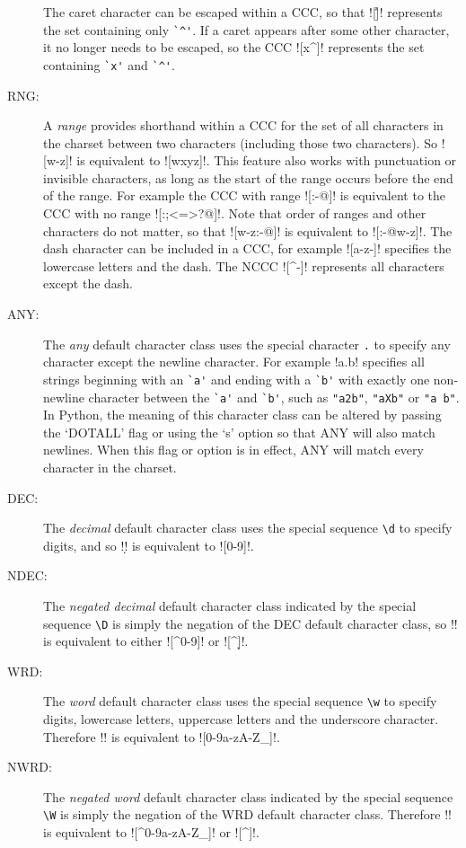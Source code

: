 \begin{description}
The caret character can be escaped within a CCC, so that \cverb![\^]! represents the set containing only \verb!`^'!.  If a caret appears after some other character, it no longer needs to be escaped, so the CCC \cverb![x^]! represents the set containing \verb!`x'! and \verb!`^'!.
\item[RNG:] A \emph{range} provides shorthand within a CCC for the set of all characters in the charset between two characters (including those two characters).  So \cverb![w-z]! is equivalent to \cverb![wxyz]!.  This feature also works with punctuation or invisible characters, as long as the start of the range occurs before the end of the range.  For example the CCC with range \cverb![:-@]! is equivalent to the CCC with no range \cverb![:;<=>?@]!.  Note that order of ranges and other characters do not matter, so that \cverb![w-z:-@]! is equivalent to \cverb![:-@w-z]!.  The dash character can be included in a CCC, for example \cverb![a-z-]! specifies the lowercase letters and the dash.  The NCCC \cverb![^-]! represents all characters except the dash.
\item[ANY:] The \emph{any} default character class uses the special character \verb!.! to specify any character except the newline character.  For example \cverb!a.b! specifies all strings beginning with an \verb!`a'! and ending with a \verb!`b'! with exactly one non-newline character between the \verb!`a'! and \verb!`b'!, such as \verb!"a2b"!, \verb!"aXb"! or \verb!"a b"!.  In Python, the meaning of this character class can be altered by passing the `DOTALL' flag or using the `s' option so that ANY will also match newlines.  When this flag or option is in effect, ANY will match every character in the charset.
\item[DEC:] The \emph{decimal} default character class uses the special sequence \verb!\d! to specify digits, and so \cverb!\d! is equivalent to \cverb![0-9]!.
\item[NDEC:] The \emph{negated decimal} default character class indicated by the special sequence \verb!\D! is simply the negation of the DEC default character class, so \cverb!\D! is equivalent to either \cverb![^0-9]! or \cverb![^\d]!.
\item[WRD:] The \emph{word} default character class uses the special sequence \verb!\w! to specify digits, lowercase letters, uppercase letters and the underscore character.  Therefore \cverb!\w! is equivalent to \cverb![0-9a-zA-Z_]!.
\item[NWRD:] The \emph{negated word} default character class indicated by the special sequence \verb!\W! is simply the negation of the WRD default character class.  Therefore \cverb!\W! is equivalent to \cverb![^0-9a-zA-Z_]! or \cverb![^\w]!.

\end{description}
